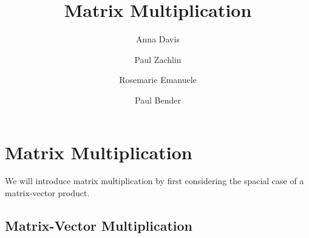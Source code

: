 \documentclass{ximera}
\author{Anna Davis \and Paul Zachlin \and Rosemarie Emanuele \and Paul Bender} \title{Matrix Multiplication} \license{CC-BY 4.0}
\begin{document}
\begin{abstract}
\end{abstract}
\maketitle

\section*{Matrix Multiplication}

We will introduce matrix multiplication by first considering the spacial case of a matrix-vector product.

\subsection*{Matrix-Vector Multiplication}
\end{document}
